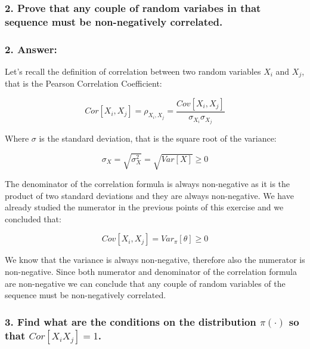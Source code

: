 \documentclass[
]{article}
\begin{document}
\hypertarget{prove-that-any-couple-of-random-variabes-in-that-sequence-must-be-non-negatively-correlated.}{%
\subsubsection{2. Prove that any couple of random variabes in that
sequence must be non-negatively
correlated.}\label{prove-that-any-couple-of-random-variabes-in-that-sequence-must-be-non-negatively-correlated.}}

\hypertarget{answer-6}{%
\subsubsection{2. Answer:}\label{answer-6}}

Let's recall the definition of correlation between two random variables
\(X_i\) and \(X_j\), that is the Pearson Correlation Coefficient:

\[
Cor[X_i, X_j] = \rho_{X_i,X_j} = \frac{Cov[X_i, X_j]}{\sigma_{X_i}\sigma_{X_j}}
\]

Where \(\sigma\) is the standard deviation, that is the square root of
the variance:

\[
\sigma_X = \sqrt{\sigma^2_X}=\sqrt{Var[X]}\ge0
\]

The denominator of the correlation formula is always non-negative as it
is the product of two standard deviations and they are always
non-negative. We have already studied the numerator in the previous
points of this exercise and we concluded that:

\[
Cov[X_i, X_j] = Var_\pi[\theta] \ge 0
\]

We know that the variance is always non-negative, therefore also the
numerator is non-negative. Since both numerator and denominator of the
correlation formula are non-negative we can conclude that any couple of
random variables of the sequence must be non-negatively correlated.

\hypertarget{find-what-are-the-conditions-on-the-distribution-picdot-so-that-corx_i-x_j1.}{%
\subsubsection{\texorpdfstring{3. Find what are the conditions on the
distribution \(\pi(\cdot)\) so that
\(Cor[X_i X_j]=1\).}{3. Find what are the conditions on the distribution \textbackslash pi(\textbackslash cdot) so that Cor{[}X\_i X\_j{]}=1.}}\label{find-what-are-the-conditions-on-the-distribution-picdot-so-that-corx_i-x_j1.}}
\end{document}
